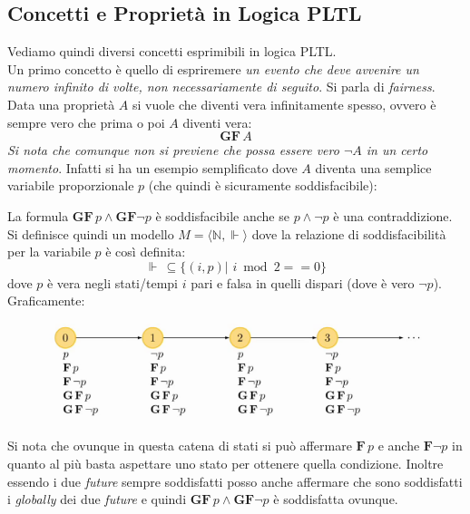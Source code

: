 \documentclass[a4paper,12pt, oneside]{book}
\begin{document}
\begin{definizione}
\begin{itemize}
\begin{figure}[H]
    \end{figure}
  \end{itemize}
\end{definizione}
\subsection{Concetti e Proprietà in Logica PLTL}
Vediamo quindi diversi concetti esprimibili in logica PLTL.\\
Un primo concetto è quello di espriremere \textit{un evento che deve avvenire un
  numero infinito di volte, non necessariamente di seguito}. Si parla di
\textit{fairness}.\\
Data una proprietà $A$ si vuole che diventi vera infinitamente spesso, ovvero è
sempre vero che prima o poi $A$ diventi vera:
\[\mathbf{GF}\,A\]
\textit{Si nota che comunque non si previene che possa essere vero $\neg A$ in
  un certo momento}. Infatti si ha un esempio semplificato dove $A$ diventa una
semplice variabile proporzionale $p$ (che quindi è sicuramente soddisfacibile):
\begin{esempio}
  La formula $\mathbf{GF}\,p\land \mathbf{GF}\neg p$ è soddisfacibile anche se
  $p\land\neg p$ è una contraddizione.\\
  Si definisce quindi un modello $M=\langle\mathbb{N},\Vdash\rangle$ dove la
  relazione di soddisfacibilità per la variabile $p$ è così definita:
  \[\Vdash\,\subseteq\{(i, p) |\,\, i \bmod 2 == 0\}\]
  dove $p$ è vera negli stati/tempi $i$ pari e falsa in quelli dispari (dove è
  vero $\neg p$).\\
  Graficamente:
  \begin{figure}[H]
    \centering
    \includegraphics[scale = 0.5]{img/pltl18.png}
  \end{figure}
  Si nota che ovunque in questa catena di stati si può affermare $\mathbf{F}\,p$
  e anche $\mathbf{F}\neg p$ in quanto al più basta aspettare uno stato per
  ottenere quella condizione. Inoltre essendo i due \emph{future} sempre
  soddisfatti posso anche affermare che sono soddisfatti i \emph{globally} dei
  due \emph{future} e quindi $\mathbf{GF}\,p\land \mathbf{GF}\neg p$ è
  soddisfatta ovunque.
\end{esempio}
\end{document}

